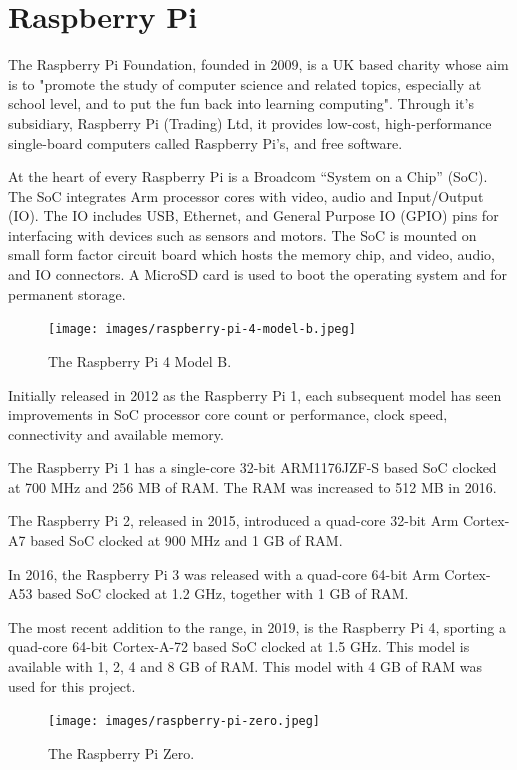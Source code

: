 \documentclass{report}
\begin{document}
%
%
\section{Raspberry Pi}

The Raspberry Pi Foundation, founded in 2009, is a UK based charity whose aim is to "promote the study of computer science and related topics, especially at school level, and to put the fun back into learning computing". Through it's subsidiary, Raspberry Pi (Trading) Ltd, it provides low-cost, high-performance single-board computers called Raspberry Pi's, and free software.

At the heart of every Raspberry Pi is a Broadcom ``System on a Chip'' (SoC). The SoC integrates Arm processor cores with video, audio and Input/Output (IO). The IO includes USB, Ethernet, and General Purpose IO (GPIO) pins for interfacing with devices such as sensors and motors. The SoC is mounted on small form factor circuit board which hosts the memory chip, and video, audio, and IO connectors. A MicroSD card is used to boot the operating system and for permanent storage.

\begin{figure}
	\centering	
	\texttt{[image: images/raspberry-pi-4-model-b.jpeg]}
	\caption{The Raspberry Pi 4 Model B.}
\end{figure}

Initially released in 2012 as the Raspberry Pi 1, each subsequent model has seen improvements in SoC processor core count or performance, clock speed, connectivity and available memory.

The Raspberry Pi 1 has a single-core 32-bit ARM1176JZF-S based SoC clocked at 700 MHz and 256 MB of RAM. The RAM was increased to 512 MB in 2016.

The Raspberry Pi 2, released in 2015, introduced a quad-core 32-bit Arm Cortex-A7 based SoC clocked at 900 MHz and 1 GB of RAM.

In 2016, the Raspberry Pi 3 was released with a quad-core 64-bit Arm Cortex-A53 based SoC clocked at 1.2 GHz, together with 1 GB of RAM.

The most recent addition to the range, in 2019, is the Raspberry Pi 4, sporting a quad-core 64-bit Cortex-A-72 based SoC clocked at 1.5 GHz. This model is available with 1, 2, 4 and 8 GB of RAM. This model with 4 GB of RAM was used for this project.

\begin{figure}
	\centering	
	\texttt{[image: images/raspberry-pi-zero.jpeg]}
	\caption{The Raspberry Pi Zero.}
\end{figure}
\end{document}
